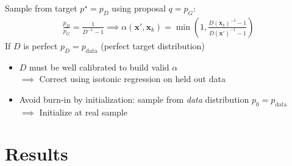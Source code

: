 \documentclass[a0,landscape]{a0poster}
\newcommand{\mysection}[1]{\section*{\fontsize{67.1}{82} \selectfont \color{NavyBlue} #1 \color{Black}}}
\renewcommand{\vec}[1]{{\boldsymbol{\mathbf{#1}}}} %
\newcommand{\target}{{p^\star}}
\newcommand{\prop}{q}
\newcommand{\PG}{{p_G}}
\newcommand{\PD}{{p_D}}
\newcommand{\PR}{{p_{\textrm{data}}}}
\newcommand{\accept}{\alpha}
\begin{document}
\begin{multicols}{3}
Sample from target $\target=\PD$ using proposal $\prop=\PG$:
\begin{align}
  \frac{\PD}{\PG} = \frac{1}{D^{-1} - 1} \implies
  \accept(\vec x', \vec x_k) = \min\left(1, \frac{D(\vec x_k)^{-1} - 1}{D(\vec x')^{-1} - 1}\right)
\end{align}
If $D$ is perfect $\PD = \PR$ (perfect target distribution)
%
\begin{itemize}
  \item $D$ must be well calibrated to build valid $\accept$\\$\implies$ Correct using isotonic regression on held out data
  \item Avoid burn-in by initialization: \!sample from \emph{data} distribution $p_0 \!=\! \PR$\\$\implies$ Initialize at real sample
\end{itemize}

\mysection{Results}


\end{multicols}
\end{document}
